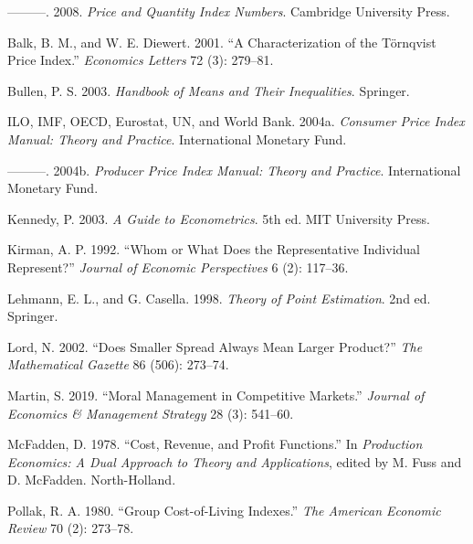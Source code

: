 \documentclass[]{article}
\begin{document}
\leavevmode\hypertarget{ref-balk2008}{}%
---------. 2008. \emph{Price and Quantity Index Numbers}. Cambridge University Press.

\leavevmode\hypertarget{ref-balk2001}{}%
Balk, B. M., and W. E. Diewert. 2001. ``A Characterization of the Törnqvist Price Index.'' \emph{Economics Letters} 72 (3): 279--81.

\leavevmode\hypertarget{ref-bullen2003}{}%
Bullen, P. S. 2003. \emph{Handbook of Means and Their Inequalities}. Springer.

\leavevmode\hypertarget{ref-cpimanual}{}%
ILO, IMF, OECD, Eurostat, UN, and World Bank. 2004a. \emph{Consumer Price Index Manual: Theory and Practice}. International Monetary Fund.

\leavevmode\hypertarget{ref-ppimanual}{}%
---------. 2004b. \emph{Producer Price Index Manual: Theory and Practice}. International Monetary Fund.

\leavevmode\hypertarget{ref-kennedy2003}{}%
Kennedy, P. 2003. \emph{A Guide to Econometrics}. 5th ed. MIT University Press.

\leavevmode\hypertarget{ref-kirman1992}{}%
Kirman, A. P. 1992. ``Whom or What Does the Representative Individual Represent?'' \emph{Journal of Economic Perspectives} 6 (2): 117--36.

\leavevmode\hypertarget{ref-lehmann1998}{}%
Lehmann, E. L., and G. Casella. 1998. \emph{Theory of Point Estimation}. 2nd ed. Springer.

\leavevmode\hypertarget{ref-lord2002}{}%
Lord, N. 2002. ``Does Smaller Spread Always Mean Larger Product?'' \emph{The Mathematical Gazette} 86 (506): 273--74.

\leavevmode\hypertarget{ref-martin2019}{}%
Martin, S. 2019. ``Moral Management in Competitive Markets.'' \emph{Journal of Economics \& Management Strategy} 28 (3): 541--60.

\leavevmode\hypertarget{ref-mcfadden1978}{}%
McFadden, D. 1978. ``Cost, Revenue, and Profit Functions.'' In \emph{Production Economics: A Dual Approach to Theory and Applications}, edited by M. Fuss and D. McFadden. North-Holland.

\leavevmode\hypertarget{ref-pollak1980}{}%
Pollak, R. A. 1980. ``Group Cost-of-Living Indexes.'' \emph{The American Economic Review} 70 (2): 273--78.
\end{document}

